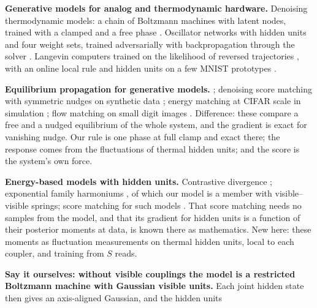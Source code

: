 \begin{plan}
  \item \textbf{Generative models for analog and thermodynamic hardware.}
        Denoising thermodynamic models: a chain of Boltzmann machines with
        latent nodes, trained with a clamped and a free phase
        \citep{jelincic2025dtm}.
        Oscillator networks with hidden units and four weight sets, trained
        adversarially with backpropagation through the solver
        \citep{wangachour2026}.
        Langevin computers trained on the likelihood of reversed trajectories
        \citep{whitelam2025generative}, with an online local rule and hidden
        units on a few MNIST prototypes \citep{wangdeng2026online}.
  \item \textbf{Equilibrium propagation for generative models.}
        \citet{scellier2017equilibrium}; denoising score matching with
        symmetric nudges on synthetic data \citep{de2026symmetric}; energy
        matching at CIFAR scale in simulation \citep{gower2026potentialep};
        flow matching on small digit images \citep{gower2026floweqprop}.
        Difference: these compare a free and a nudged equilibrium of the whole
        system, and the gradient is exact for vanishing nudge. Our rule is one
        phase at full clamp and exact there; the response comes from the
        fluctuations of thermal hidden units; and the score is the system's
        own force.
  \item \textbf{Energy-based models with hidden units.} Contrastive divergence
        \citep{hinton2002training}; exponential family harmoniums
        \citep{welling2004exponential}, of which our model is a member with
        visible--visible springs; score matching for such models
        \citep{hyvarinen2005estimation,hyvarinen2007connections,swersky2011autoencoders,vincent2011connection}.
        That score matching needs no samples from the model, and that its
        gradient for hidden units is a function of their posterior moments at
        data, is known there as mathematics. New here: these moments as
        fluctuation measurements on thermal hidden units, local to each
        coupler, and training from $S$ reads.
  \item \textbf{Say it ourselves: without visible couplings the model is a
        restricted Boltzmann machine with Gaussian visible units.} Each joint
        hidden state then gives an axis-aligned Gaussian, and the hidden units

\end{plan}
